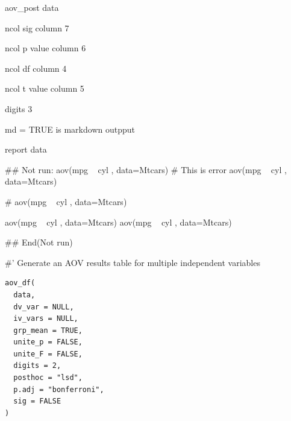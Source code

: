 \documentclass[a4paper]{book}
\begin{document}
\begin{Arguments}
\begin{ldescription}
\item[\code{aov\_post\_data}] aov\_post data

\item[\code{ns}] ncol sig column 7

\item[\code{np}] ncol p value column 6

\item[\code{ndf}] ncol df column 4

\item[\code{nt}] ncol t value column 5

\item[\code{digits}] digits 3

\item[\code{md}] md = TRUE is markdown outpput
\end{ldescription}
\end{Arguments}
%
\begin{Value}
report data
\end{Value}
%
\begin{Examples}
\begin{ExampleCode}
## Not run: 
aov(mpg ~ cyl , data=Mtcars)%
# This is error
aov(mpg ~ cyl , data=Mtcars)%

# aov(mpg ~ cyl , data=Mtcars)%

aov(mpg ~ cyl , data=Mtcars)%
aov(mpg ~ cyl , data=Mtcars)%


## End(Not run)

\end{ExampleCode}
\end{Examples}
%
\begin{Description}
\#' Generate an AOV results table for multiple independent variables
\end{Description}
%
\begin{Usage}
\begin{verbatim}
aov_df(
  data,
  dv_var = NULL,
  iv_vars = NULL,
  grp_mean = TRUE,
  unite_p = FALSE,
  unite_F = FALSE,
  digits = 2,
  posthoc = "lsd",
  p.adj = "bonferroni",
  sig = FALSE
)
\end{verbatim}
\end{Usage}
\end{document}

